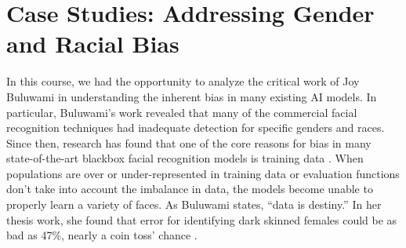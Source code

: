\documentclass[10pt]{article}
\begin{document}
\section{Case Studies: Addressing Gender and Racial Bias}

  In this course, we had the opportunity to analyze the critical work of Joy Buluwami in understanding the inherent bias in many existing AI models. In particular, Buluwami’s work revealed that many of the commercial facial recognition techniques had inadequate detection for specific genders and races. Since then, research has found that one of the core reasons for bias in many state-of-the-art blackbox facial recognition models is training data \cite{sham2023ethical}. When populations are over or under-represented in training data or evaluation functions don’t take into account the imbalance in data, the models become unable to properly learn a variety of faces. As Buluwami states, “data is destiny.” In her thesis work, she found that error for identifying dark skinned females could be as bad as 47\%, nearly a coin toss’ chance \cite{buolamwini2024examining}.
\end{document}
